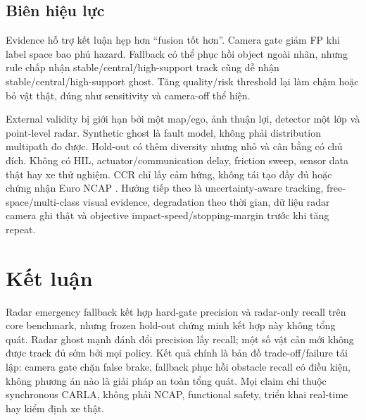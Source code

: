 \documentclass[conference]{IEEEtran}
\begin{document}
\subsection{Biên hiệu lực}
Evidence hỗ trợ kết luận hẹp hơn “fusion tốt hơn”. Camera gate giảm FP khi label
space bao phủ hazard. Fallback có thể phục hồi object ngoài nhãn, nhưng rule chấp
nhận stable/central/high-support track cũng dễ nhận stable/central/high-support
ghost. Tăng quality/risk threshold lại làm chậm hoặc bỏ vật thật, đúng như
sensitivity và camera-off thể hiện.

External validity bị giới hạn bởi một map/ego, ảnh thuận lợi, detector một lớp và
point-level radar. Synthetic ghost là fault model, không phải distribution
multipath đo được. Hold-out có thêm diversity nhưng nhỏ và cân bằng có chủ đích.
Không có HIL, actuator/communication delay, friction sweep, sensor data thật hay
xe thử nghiệm. CCR chỉ lấy cảm hứng, không tái tạo đầy đủ hoặc chứng nhận Euro
NCAP \cite{euroncap_aeb}. Hướng tiếp theo là uncertainty-aware tracking,
free-space/multi-class visual evidence, degradation theo thời gian, dữ liệu radar
camera ghi thật và objective impact-speed/stopping-margin trước khi tăng repeat.

\section{Kết luận}
Radar emergency fallback kết hợp hard-gate precision và radar-only recall trên
core benchmark, nhưng frozen hold-out chứng minh kết hợp này không tổng quát.
Radar ghost mạnh đánh đổi precision lấy recall; một số vật cản mới không được
track đủ sớm bởi mọi policy. Kết quả chính là bản đồ trade-off/failure tái lập:
camera gate chặn false brake, fallback phục hồi obstacle recall có điều kiện,
không phương án nào là giải pháp an toàn tổng quát. Mọi claim chỉ thuộc
synchronous CARLA, không phải NCAP, functional safety, triển khai real-time hay
kiểm định xe thật.

\balance


\end{document}
